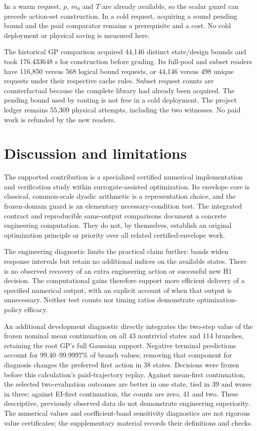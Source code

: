 \documentclass[]{interact}
\begin{document}
In a warm request, $p$, $m_0$ and $T$ are already available, so the scalar guard can precede action-set construction. In a cold request, acquiring a sound pending bound and the paid comparator remains a prerequisite and a cost. No cold deployment or physical saving is measured here.

The historical GP comparison acquired 44,146 distinct state/design bounds and took 176.433648 s for construction before grading. Its full-pool and subset readers have 116,850 versus 568 logical bound requests, or 44,146 versus 498 unique requests under their respective cache rules. Subset request counts are counterfactual because the complete library had already been acquired. The pending bound used by routing is not free in a cold deployment. The project ledger remains 55,309 physical attempts, including the two witnesses. No paid work is refunded by the new readers.

\section{Discussion and limitations}

The supported contribution is a specialized certified numerical implementation and verification study within surrogate-assisted optimization. Its envelope core is classical, common-scale dyadic arithmetic is a representation choice, and the frozen-domain guard is an elementary necessary-condition test. The integrated contract and reproducible same-output comparisons document a concrete engineering computation. They do not, by themselves, establish an original optimization principle or priority over all related certified-envelope work.

The engineering diagnostic limits the practical claim further: bands widen response intervals but retain no additional indices on the available states. There is no observed recovery of an extra engineering action or successful new H1 decision. The computational gains therefore support more efficient delivery of a specified numerical output, with an explicit account of when that output is unnecessary. Neither test counts nor timing ratios demonstrate optimization-policy efficacy.

An additional development diagnostic directly integrates the two-step value of the frozen nominal mean continuation on all 43 nontrivial states and 114 branches, retaining the root GP's full Gaussian support. Negative terminal predictions account for 99.40--99.9997\% of branch values; removing that component for diagnosis changes the preferred first action in 38 states. Decisions were frozen before this calculation's paid-trajectory replay. Against mean-first continuation, the selected two-evaluation outcomes are better in one state, tied in 39 and worse in three; against EI-first continuation, the counts are zero, 41 and two. These descriptive, previously observed data do not demonstrate engineering superiority. The numerical values and coefficient-band sensitivity diagnostics are not rigorous value certificates; the supplementary material records their definitions and checks.
\end{document}
